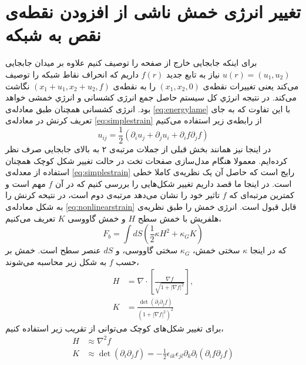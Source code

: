 \section{
تغییر انرژی خمش ناشی از افزودن نقطه‌ی نقص به شبکه
}
برای اینکه جابجایی خارج از صفحه را توصیف کنیم علاوه بر میدان جابجایی 
$u(r)=(u_1,u_2)$
نیاز به تابع جدید 
$f(r)$
داریم که انحراف
 نقاط شبکه را توصیف می‌کند یعنی تغییرات نقطه‌ی 
$(x_1,x_2,0)$
را به نقطه‌ی 
$(x_1+u_1,x_2+u_2,f)$
نگاشت می‌کند. در نتیجه انرژي کل سیستم حاصل جمع انرژی کشسانی و انرژي خمشی خواهد بود. انرژی کشسانی همچنان طبق معادله‌ی
\ref{eq:energylame}
با این تفاوت که به جای تعریف کرنش در معادله‌ی 
\ref{eq:simplestrain}
از رابطه‌ی زیر استفاده می‌کنیم
\begin{equation}
u_{ij}=\frac{1}{2}(\partial_iu_j+\partial_ju_i+\partial_if\partial_jf)
\label{eq:nonlinearstrain}
\end{equation}
در اینجا نیز همانند بخش قبلی از جملات مرتبه‌ی ۲ به بالای جابجایی صرف نظر کرده‌ایم. معمولا هنگام  مدل‌سازی صفحات تخت در حالت تغییر شکل کوچک همچنان استفاده از معدله‌ی 
\ref{eq:simplestrain}
رایج است که حاصل آن یک نظریه‌ی کاملا خطی است. در اینجا ما قصد داریم تغییر شکل‌هایی را بررسی کنیم که در آن $f$ مهم است و کمترین مرتبه‌ای که $f$ 
تاثیر خود را نشان می‌دهد مرتبه‌ی دوم است، در نتیحه کرنش را به شکل  معادله‌ی 
\ref{eq:nonlinearstrain}
قابل قبول است. انرژی خمش را طبق نظریه‌ی هلفریش
\cite{Helfrich1973}
با خمش سطح $H$
و خمش گاووسی $K$
تعریف می‌کنیم، 
\begin{equation}
F_b=\int dS\left(\frac{1}{2}\kappa H^2+\kappa_GK\right)
\end{equation}
که در اینجا 
$\kappa$
سختی خمش، 
$\kappa_G$
سختی گاووسی، و 
$dS$
عنصر سطح است. خمش بر حسب 
$f$
 به شکل زیر محاسبه می‌شوند،
\begin{equation}
\begin{aligned}
H&=\nabla\cdot\left[\frac{\nabla f}{\sqrt{1+|\nabla f|^2}}\right],\\
K&=\frac{\det(\partial_i\partial_jf)}{\left(1+|\nabla f|^2\right)^2}
\end{aligned}
\end{equation}
برای تغییر شکل‌های کوچک می‌توانی از تقریب زیر استفاده کنیم،
\begin{equation}
\begin{aligned}
H&\approx\nabla^2f\\
K&\approx \det(\partial_i\partial_jf)=-\frac{1}{2}\epsilon_{ik}\epsilon_{jl}\partial_k\partial_l(\partial_if\partial_jf)
\end{aligned}
\end{equation}
